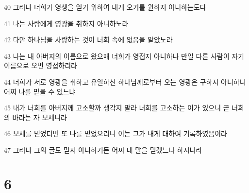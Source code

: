 \par 40 그러나 너희가 영생을 얻기 위하여 내게 오기를 원하지 아니하는도다
\par 41 나는 사람에게 영광을 취하지 아니하노라
\par 42 다만 하나님을 사랑하는 것이 너희 속에 없음을 알았노라
\par 43 나는 내 아버지의 이름으로 왔으매 너희가 영접지 아니하나 만일 다른 사람이 자기 이름으로 오면 영접하리라
\par 44 너희가 서로 영광을 취하고 유일하신 하나님께로부터 오는 영광은 구하지 아니하니 어찌 나를 믿을 수 있느냐
\par 45 내가 너희를 아버지께 고소할까 생각지 말라 너희를 고소하는 이가 있으니 곧 너희의 바라는 자 모세니라
\par 46 모세를 믿었더면 또 나를 믿었으리니 이는 그가 내게 대하여 기록하였음이라
\par 47 그러나 그의 글도 믿지 아니하거든 어찌 내 말을 믿겠느냐 하시니라

\chapter{6}

